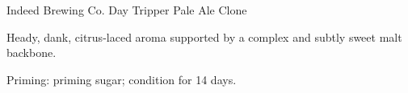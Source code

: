 \begin{recipe}{Indeed Brewing Co. Day Tripper Pale Ale Clone} %

\begin{aboutblock}
Heady, dank, citrus-laced aroma supported by a complex and subtly sweet
malt backbone. \sourceaha
\end{aboutblock}


\begin{methodandtiming}
 
\begin{mashsteps}
\end{mashsteps}

\begin{fermentationsteps}
\end{fermentationsteps}

\begin{directions}
Priming:  priming sugar; condition for 14 days.
\end{directions}

\end{methodandtiming}

\recipebreak

\begin{ingredientsblock}

\begin{malts}

\end{malts}

\begin{hops}
\end{hops}


\end{ingredientsblock}

\end{recipe}

